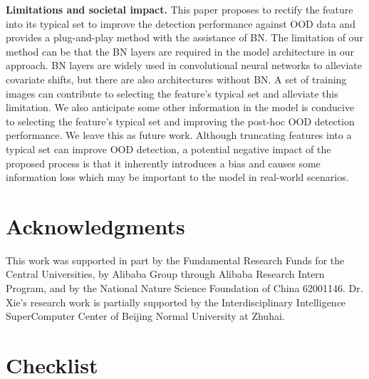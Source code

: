 \documentclass{article}
\begin{document}
\textbf{Limitations and societal impact.} This paper proposes to rectify the feature into its typical set to improve the detection performance against OOD data and provides a plug-and-play method with the assistance of BN. The limitation of our method can be that the BN layers are required in the model architecture in our approach. BN layers are widely used in convolutional neural networks to alleviate covariate shifts, but there are also architectures without BN. A set of training images can contribute to selecting the feature's typical set and alleviate this limitation. We also anticipate some other information in the model is conducive to selecting the feature's typical set and improving the post-hoc OOD detection performance. We leave this as future work. {Although truncating features into a typical set can improve OOD detection, a potential negative impact of the proposed process is that it inherently introduces a bias and causes some information loss which may be important to the model in real-world scenarios.}

\section*{Acknowledgments}
This work was supported in part by the Fundamental Research Funds for the Central Universities, by Alibaba Group through Alibaba Research Intern Program, and by the National Nature Science Foundation of China 62001146. Dr. Xie's research work is partially supported by the Interdisciplinary Intelligence SuperComputer Center of Beijing Normal University at Zhuhai.













\section*{Checklist}
\end{document}
